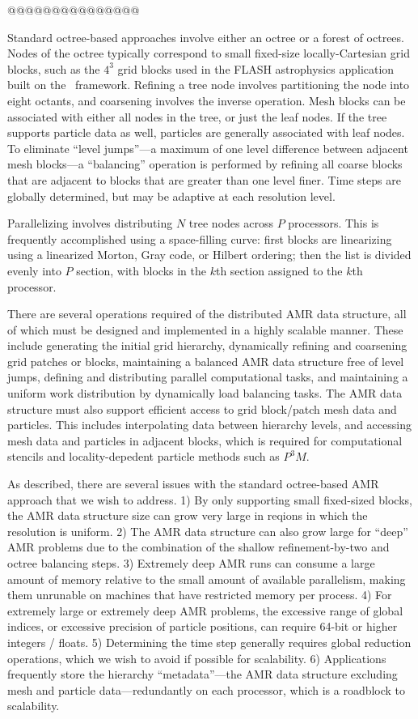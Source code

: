 \documentclass[10pt]{article}
\begin{document}
@@@@@@@@@@@@@@@

Standard octree-based approaches involve either an octree or a forest
of octrees.  Nodes of the octree typically correspond to small
fixed-size locally-Cartesian grid blocks, such as the $4^3$ grid
blocks used in the FLASH astrophysics application built on the
\paramesh\ framework.  Refining a tree node involves partitioning the
node into eight octants, and coarsening involves the inverse
operation.  Mesh blocks can be associated with either all nodes in the
tree, or just the leaf nodes.  If the tree supports particle data as
well, particles are generally associated with leaf nodes.  To
eliminate ``level jumps''---a maximum of one level difference between
adjacent mesh blocks---a ``balancing'' operation is performed by
refining all coarse blocks that are adjacent to blocks that are
greater than one level finer.  Time steps are globally determined,
but may be adaptive at each resolution level.

Parallelizing involves distributing $N$ tree nodes across $P$
processors.  This is frequently accomplished using a space-filling
curve: first blocks are linearizing using a linearized Morton, Gray
code, or Hilbert ordering; then the list is divided evenly into $P$
section, with blocks in the $k$th section assigned to the $k$th
processor.

There are several operations required of the distributed AMR data
structure, all of which must be designed and implemented in a highly
scalable manner.  These include generating the initial grid hierarchy,
dynamically refining and coarsening grid patches or blocks,
maintaining a balanced AMR data structure free of level jumps,
defining and distributing parallel computational tasks, and
maintaining a uniform work distribution by dynamically load balancing
tasks.  The AMR data structure must also support efficient access to
grid block/patch mesh data and particles.  This includes interpolating
data between hierarchy levels, and accessing mesh data and particles
in adjacent blocks, which is required for computational stencils and
locality-depedent particle methods such as $P^3M$.

As described, there are several issues with the standard octree-based
AMR approach that we wish to address.  
%
1) By only supporting small fixed-sized blocks, the AMR data structure
size can grow very large in reqions in which the resolution is
uniform.
%
2) The AMR data structure can also grow large for ``deep'' AMR
problems due to the combination of the shallow refinement-by-two and
octree balancing steps.
%
3) Extremely deep AMR runs can consume a large amount of memory
relative to the small amount of available parallelism, making them
unrunable on machines that have restricted memory per process.
%
4) For extremely large or extremely deep AMR problems, the excessive
range of global indices, or excessive precision of particle positions,
can require 64-bit or higher integers / floats.
%
5) Determining the time step generally requires global reduction
operations, which we wish to avoid if possible for scalability.
%
6) Applications frequently store the hierarchy ``metadata''---the AMR
data structure excluding mesh and particle data---redundantly on each
processor, which is a roadblock to scalability.
\end{document}
